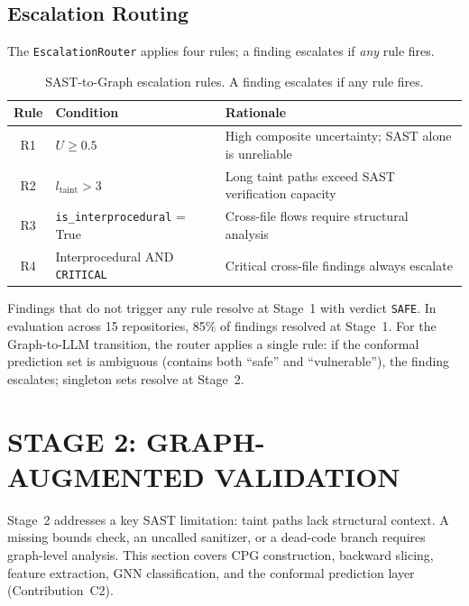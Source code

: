 \subsection{Escalation Routing}

The \texttt{EscalationRouter} applies four rules; a finding escalates if \emph{any} rule fires.

\begin{table}[H]
\centering
\small
\caption{SAST-to-Graph escalation rules. A finding escalates if any rule fires.}
\label{tab:routing-rules}
\begin{tabular}{clp{7cm}}
\toprule
\textbf{Rule} & \textbf{Condition} & \textbf{Rationale} \\
\midrule
R1 & $U \geq 0.5$ & High composite uncertainty; SAST alone is unreliable \\
R2 & $l_{\text{taint}} > 3$ & Long taint paths exceed SAST verification capacity \\
R3 & \texttt{is\_interprocedural} = True & Cross-file flows require structural analysis \\
R4 & Interprocedural AND \texttt{CRITICAL} & Critical cross-file findings always escalate \\
\bottomrule
\end{tabular}
\end{table}

Findings that do not trigger any rule resolve at Stage~1 with verdict \texttt{SAFE}. In evaluation across 15 repositories, 85\% of findings resolved at Stage~1. For the Graph-to-LLM transition, the router applies a single rule: if the conformal prediction set is ambiguous (contains both ``safe'' and ``vulnerable''), the finding escalates; singleton sets resolve at Stage~2.

\section{\uppercase{Stage 2: Graph-Augmented Validation}}
\label{sec:graph}

Stage~2 addresses a key SAST limitation: taint paths lack structural context. A missing bounds check, an uncalled sanitizer, or a dead-code branch requires graph-level analysis. This section covers CPG construction, backward slicing, feature extraction, GNN classification, and the conformal prediction layer (Contribution~C2).

